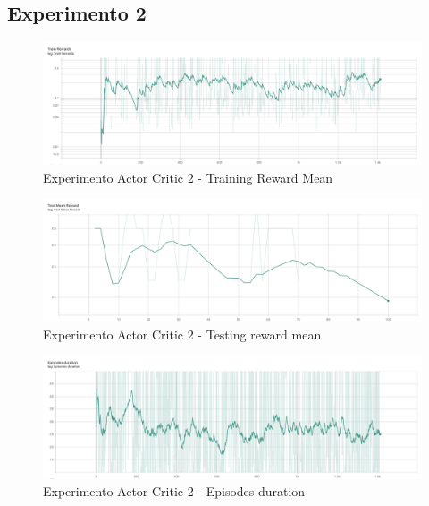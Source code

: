 \subsection{Experimento 2}
\label{resultados-actor-critic-experimento-2}

\begin{figure}[H]
	\centering
	\includegraphics[width=1\textwidth]{figuras/experiments/actor_critic/actor_critic_no_rewards_till_complete/train_rewards.png}
	\caption[Experimento Actor Critic 2 - Training Reward Mean]{Experimento Actor Critic 2 - Training Reward Mean}
	\label{fig-experimento-actor-critic-2-training-reward-mean}
\end{figure}
\begin{figure}[H]
	\centering
	\includegraphics[width=1\textwidth]{figuras/experiments/actor_critic/actor_critic_no_rewards_till_complete/test_mean_reward.png}
	\caption[Experimento Actor Critic 2 - Testing reward mean]{Experimento Actor Critic 2 - Testing reward mean}
	\label{fig-experimento-actor-critic-2-testing-reward-mean}
\end{figure}
\begin{figure}[H]
	\centering
	\includegraphics[width=1\textwidth]{figuras/experiments/actor_critic/actor_critic_no_rewards_till_complete/episodes_duration.png}
	\caption[Experimento Actor Critic 2 - Episodes duration]{Experimento Actor Critic 2 - Episodes duration}
	\label{fig-experimento-actor-critic-2-episodes-duration}
\end{figure}

